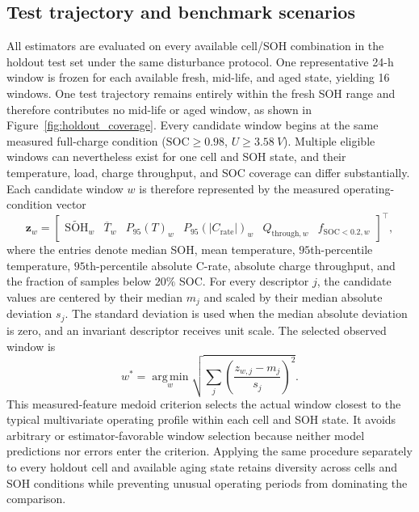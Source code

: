 \documentclass[review,nopreprintline]{elsarticle}
\begin{document}
\subsection{Test trajectory and benchmark scenarios}
\label{sec:representative_windows}
All estimators are evaluated on every available cell/SOH combination in the holdout test set under the same disturbance protocol. One representative 24-h window is frozen for each available fresh, mid-life, and aged state, yielding 16 windows. One test trajectory remains entirely within the fresh SOH range and therefore contributes no mid-life or aged window, as shown in Figure~\ref{fig:holdout_coverage}. Every candidate window begins at the same measured full-charge condition ($\mathrm{SOC}\geq0.98$, $U\geq\SI{3.58}{V}$). Multiple eligible windows can nevertheless exist for one cell and SOH state, and their temperature, load, charge throughput, and SOC coverage can differ substantially. Each candidate window $w$ is therefore represented by the measured operating-condition vector
\begin{equation}
    \mathbf{z}_w =
    \begin{bmatrix}
        \widetilde{\mathrm{SOH}}_w &
        \overline{T}_w &
        P_{95}(T)_w &
        P_{95}(|C_{\mathrm{rate}}|)_w &
        Q_{\mathrm{through},w} &
        f_{\mathrm{SOC}<0.2,w}
    \end{bmatrix}^{\top},
    \label{eq:window_descriptor}
\end{equation}
where the entries denote median SOH, mean temperature, $95$th-percentile temperature, $95$th-percentile absolute C-rate, absolute charge throughput, and the fraction of samples below $20\%$ SOC. For every descriptor $j$, the candidate values are centered by their median $m_j$ and scaled by their median absolute deviation $s_j$. The standard deviation is used when the median absolute deviation is zero, and an invariant descriptor receives unit scale. The selected observed window is
\begin{equation}
    w^{*}=\operatorname*{arg\,min}_{w}
    \sqrt{\sum_j\left(\frac{z_{w,j}-m_j}{s_j}\right)^2}.
    \label{eq:window_medoid}
\end{equation}
This measured-feature medoid criterion selects the actual window closest to the typical multivariate operating profile within each cell and SOH state. It avoids arbitrary or estimator-favorable window selection because neither model predictions nor errors enter the criterion. Applying the same procedure separately to every holdout cell and available aging state retains diversity across cells and SOH conditions while preventing unusual operating periods from dominating the comparison.
\end{document}
